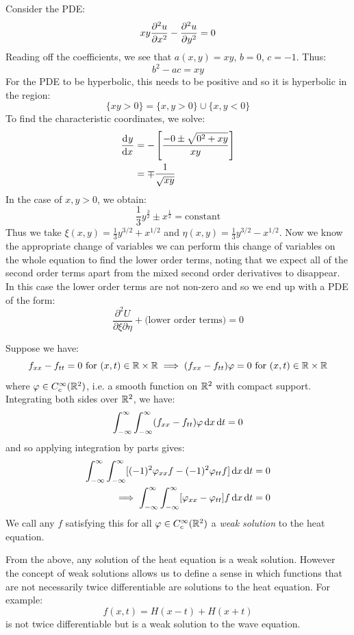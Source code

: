 \documentclass[../main.tex]{subfiles}
\begin{document}
\begin{example}
  Consider the PDE:
  \[
    xy \pderiv[2]{u}{x} - \pderiv[2]{u}{y} = 0
  \]
  Reading off the coefficients, we see that $a(x, y) = xy$, $b = 0$, $c = - 1$.
  Thus:
  \[
    b^2 - ac = xy
  \]
  For the PDE to be hyperbolic, this needs to be positive and so it is hyperbolic in the region:
  \[
    \{xy > 0\} = \{x, y > 0\} \cup \{x, y < 0\}
  \]
  To find the characteristic coordinates, we solve:
  \begin{align*}
    \deriv{y}{x} &= -\left[\frac{-0 \pm \sqrt{0^2 + xy}}{xy}\right] \\
                 &= \mp \frac{1}{\sqrt{xy}}
  \end{align*}
  In the case of $x, y > 0$, we obtain:
  \[
    \frac{1}{3} y^{\frac{3}{2}} \pm x^{\frac{1}{2}} = \text{constant}
  \]
  Thus we take $\xi(x, y) = \frac{1}{3} y^{3/2} + x^{1/2}$ and $\eta(x, y) = \frac{1}{3} y^{3/2} - x^{1/2}$.
  Now we know the appropriate change of variables we can perform this change of variables on the whole equation to find the lower order terms, noting that we expect all of the second order terms apart from the mixed second order derivatives to disappear.
  In this case the lower order terms are not non-zero and so we end up with a PDE of the form:
  \[
    \frac{\partial^2 U}{\partial \xi \partial \eta} + \text{(lower order terms)} = 0
  \]
\end{example}
\begin{remark}
  \nonexaminable
  Suppose we have:
  \[
    f_{x x} - f_{t t} = 0 \text{ for } (x, t) \in \mathbb{R} \times \mathbb{R}
    \implies (f_{x x} - f_{t t}) \varphi = 0 \text{ for } (x, t) \in \mathbb{R} \times \mathbb{R}
  \]
  where $\varphi \in C^{\infty}_c(\mathbb{R}^2)$, i.e. a smooth function on $\mathbb{R}^2$ with compact support.
  Integrating both sides over $\mathbb{R}^2$, we have:
  \[
    \int_{-\infty}^{\infty} \int_{-\infty}^{\infty} (f_{x x} - f_{t t}) \varphi \d{x} \d{t} = 0
  \]
  and so applying integration by parts gives:
  \begin{align*}
    \int_{-\infty}^{\infty} \int_{-\infty}^{\infty} [(-1)^2 \varphi_{x x} f - (-1)^2 \varphi_{t t} f] \d{x} \d{t} = 0 \\
    \implies \int_{-\infty}^{\infty} \int_{-\infty}^{\infty} [\varphi_{x x} - \varphi_{t t}]f \d{x} \d{t} = 0
  \end{align*}
  We call any $f$ satisfying this for all $\varphi \in C^{\infty}_c(\mathbb{R}^2)$ a \textit{weak solution} to the heat equation.

  From the above, any solution of the heat equation is a weak solution.
  However the concept of weak solutions allows us to define a sense in which functions that are not necessarily twice differentiable are solutions to the heat equation.
  For example:
  \[
    f(x, t) = H(x - t) + H(x + t)
  \]
  is not twice differentiable but is a weak solution to the wave equation.
\end{remark}
\end{document}
